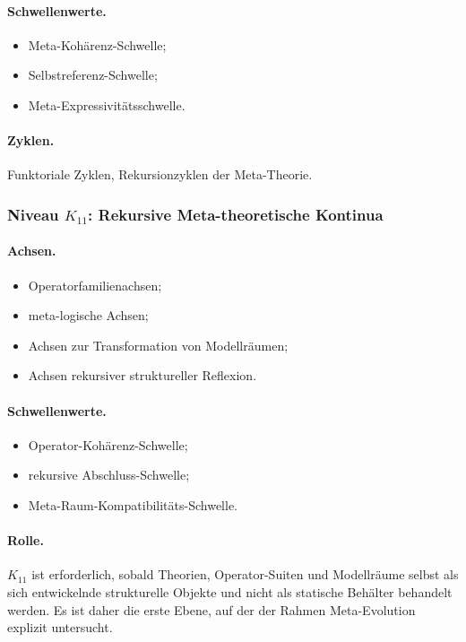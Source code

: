 \paragraph{Schwellenwerte.}
\begin{itemize}
    \item Meta-Kohärenz-Schwelle;
    \item Selbstreferenz-Schwelle;
    \item Meta-Expressivitätsschwelle.
\end{itemize}

\paragraph{Zyklen.}
Funktoriale Zyklen, Rekursionzyklen der Meta-Theorie.

\subsubsection{Niveau \(K_{11}\): Rekursive Meta-theoretische Kontinua}

\paragraph{Achsen.}
\begin{itemize}
    \item Operatorfamilienachsen;
    \item meta-logische Achsen;
    \item Achsen zur Transformation von Modellräumen;
    \item Achsen rekursiver struktureller Reflexion.
\end{itemize}

\paragraph{Schwellenwerte.}
\begin{itemize}
    \item Operator-Kohärenz-Schwelle;
    \item rekursive Abschluss-Schwelle;
    \item Meta-Raum-Kompatibilitäts-Schwelle.
\end{itemize}

\paragraph{Rolle.}
\(K_{11}\) ist erforderlich, sobald Theorien, Operator-Suiten und Modellräume
selbst als sich entwickelnde strukturelle Objekte und nicht als statische
Behälter behandelt werden. Es ist daher die erste Ebene, auf der der Rahmen
Meta-Evolution explizit untersucht.

